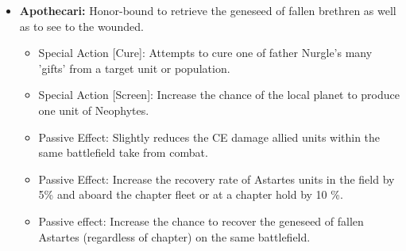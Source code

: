 \begin{itemize}
    \item \textbf{Apothecari:} Honor-bound to retrieve the geneseed of fallen brethren as well as to see to the wounded.
    \begin{itemize}
        \item Special Action [Cure]: Attempts to cure one of father Nurgle's many 'gifts' from a target unit or population.
        \item Special Action [Screen]: Increase the chance of the local planet to produce one unit of Neophytes.
        \item Passive Effect: Slightly reduces the CE damage allied units within the same battlefield take from combat.
        \item Passive Effect: Increase the recovery rate of Astartes units in the field by 5\% and aboard the chapter fleet or at a chapter hold by 10 \%.
        \item Passive effect: Increase the chance to recover the geneseed of fallen Astartes (regardless of chapter) on the same battlefield.
    \end{itemize}
    

\end{itemize}
